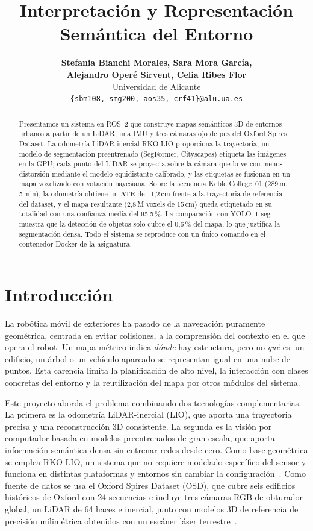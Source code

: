\documentclass[11pt, twoside]{article}
\title{Interpretación y Representación Semántica del Entorno}
\author{
  \textbf{Stefania Bianchi Morales, Sara Mora García,}\\
  \textbf{Alejandro Operé Sirvent, Celia Ribes Flor}\\[0.3cm]
  Universidad de Alicante\\
  \texttt{\{sbm108, smg200, aos35, crf41\}@alu.ua.es}
}
\begin{document}
\maketitle
\thispagestyle{firstpage}

\begin{abstract}
Presentamos un sistema en ROS~2 que construye mapas semánticos 3D de entornos urbanos a partir de un LiDAR, una IMU y tres cámaras ojo de pez del Oxford Spires Dataset. La odometría LiDAR-inercial RKO-LIO proporciona la trayectoria; un modelo de segmentación preentrenado (SegFormer, Cityscapes) etiqueta las imágenes en la GPU; cada punto del LiDAR se proyecta sobre la cámara que lo ve con menos distorsión mediante el modelo equidistante calibrado, y las etiquetas se fusionan en un mapa voxelizado con votación bayesiana. Sobre la secuencia Keble College~01 (289\,m, 5\,min), la odometría obtiene un ATE de 11,2\,cm frente a la trayectoria de referencia del dataset, y el mapa resultante (2,8\,M voxels de 15\,cm) queda etiquetado en su totalidad con una confianza media del 95,5\,\%. La comparación con YOLO11-seg muestra que la detección de objetos solo cubre el 0,6\,\% del mapa, lo que justifica la segmentación densa. Todo el sistema se reproduce con un único comando en el contenedor Docker de la asignatura.
\end{abstract}

\section{Introducción}
La robótica móvil de exteriores ha pasado de la navegación puramente geométrica, centrada en evitar colisiones, a la comprensión del contexto en el que opera el robot. Un mapa métrico indica \emph{dónde} hay estructura, pero no \emph{qué} es: un edificio, un árbol o un vehículo aparcado se representan igual en una nube de puntos. Esta carencia limita la planificación de alto nivel, la interacción con clases concretas del entorno y la reutilización del mapa por otros módulos del sistema.

Este proyecto aborda el problema combinando dos tecnologías complementarias. La primera es la odometría LiDAR-inercial (LIO), que aporta una trayectoria precisa y una reconstrucción 3D consistente. La segunda es la visión por computador basada en modelos preentrenados de gran escala, que aporta información semántica densa sin entrenar redes desde cero. Como base geométrica se emplea RKO-LIO, un sistema que no requiere modelado específico del sensor y funciona en distintas plataformas y entornos sin cambiar la configuración~\cite{malladi2026rkolio}. Como fuente de datos se usa el Oxford Spires Dataset (OSD), que cubre seis edificios históricos de Oxford con 24 secuencias e incluye tres cámaras RGB de obturador global, un LiDAR de 64 haces e inercial, junto con modelos 3D de referencia de precisión milimétrica obtenidos con un escáner láser terrestre~\cite{tao2024spires}.
\end{document}
